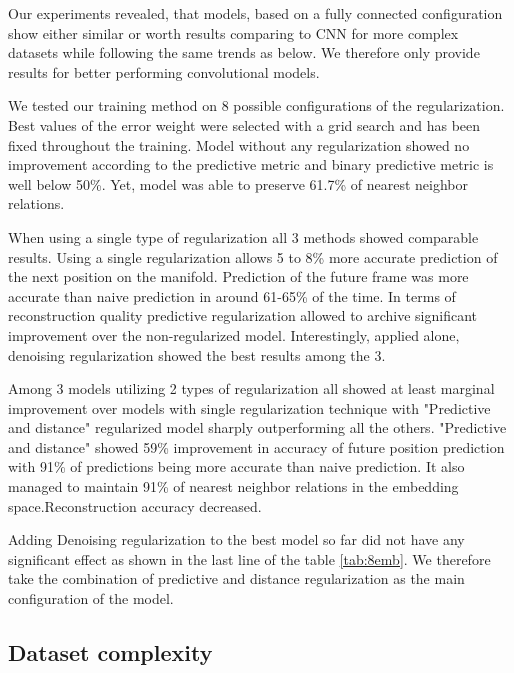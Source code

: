 Our experiments revealed, that models, based on a fully connected configuration show either similar or worth results comparing to CNN for more complex datasets while following the same trends as below. We therefore only provide results for better performing convolutional models.

We tested our training method on 8 possible configurations of the regularization. Best values of the error weight were selected with a grid search and has been fixed throughout the training. Model without any regularization showed
no improvement according to the predictive metric and binary predictive metric is well below 50\%. Yet, model was able to preserve 61.7\% of nearest neighbor relations.

When using a single type of regularization all 3 methods showed comparable results. Using a single regularization allows 5 to 8\% more accurate prediction of the next position on the manifold. Prediction of the future frame was more accurate than naive prediction in around 61-65\% of the time. In terms of reconstruction quality predictive regularization allowed to archive significant improvement over the non-regularized model. Interestingly, applied alone, denoising regularization showed the best results among the 3.

Among 3 models utilizing 2 types of regularization all showed at least marginal improvement over models with single regularization technique with "Predictive and distance" regularized model sharply outperforming all the others. "Predictive and distance" showed 59\% improvement in accuracy of future position prediction with 91\% of predictions being more accurate than naive prediction. It also managed to maintain 91\% of nearest neighbor relations in the embedding space.Reconstruction accuracy decreased.

Adding Denoising regularization to the best model so far did not have any significant effect as shown in the last line of the table \ref{tab:8emb}. We therefore take the combination of predictive and distance regularization as the main configuration of the model.


\subsection{Dataset complexity}

